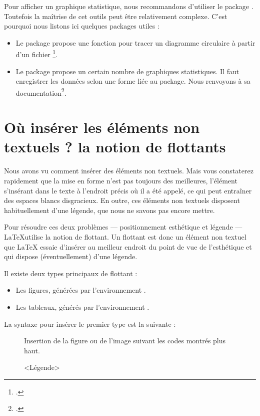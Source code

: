 \begin{plusloins}
Pour afficher un graphique statistique, nous recommandons d'utiliser le package . Toutefois la maîtrise de cet outils peut être relativement complexe. C'est pourquoi nous listons ici quelques packages utiles : 
\begin{itemize}
\item Le package  propose une fonction pour tracer un diagramme circulaire à partir d'un fichier \footcite[Sa documentation se trouve dans celle du package  :][]{csvtools_pie}. 
\item Le package  propose un certain nombre de graphiques statistiques. Il faut enregistrer les données selon une forme liée au package. Nous renvoyons à sa documentation\footcite{datatool}.
\end{itemize}
\end{plusloins}


\section[La notion de flottants]{Où insérer les éléments non textuels ?  la notion de flottants}
\label{legende}
Nous avons vu comment insérer des éléments non textuels. Mais vous constaterez rapidement que la mise en forme n'est pas toujours des meilleures, l'élément s'insérant dans le texte à l'endroit précis où il a été appelé, ce qui peut entraîner des espaces blancs disgracieux.
En outre, ces éléments non textuels disposent habituellement d'une légende, que nous ne savons pas encore mettre.

Pour résoudre ces deux problèmes --- positionnement esthétique et légende --- \LaTeX utilise la notion de flottant. Un flottant est donc un élément non textuel que LaTeX essaie d'insérer au meilleur endroit du point de vue de l'esthétique et qui dispose (éventuellement) d'une légende.

Il existe deux types principaux de flottant :
\begin{itemize}
    \item Les figures, générées par l'environnement .
    \item Les tableaux, générés par l'environnement .
\end{itemize}

La syntaxe pour insérer le premier type est la suivante :

\begin{latexcode}
\begin{figure}[<paramètre de placement>]
    Insertion de la figure ou de l'image suivant les codes montrés plus haut.
    \caption{<Légende>}
\end{figure} 
\end{latexcode}


